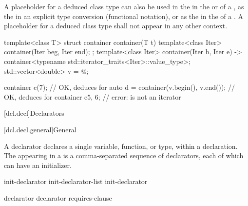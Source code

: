 \pnum
A placeholder for a deduced class type
can also be used
in the 
in the  or 
of a ,
as the 
in an explicit type conversion (functional notation),
or
as the  in the 
of a .
A placeholder for a deduced class type
shall not appear in any other context.

\pnum
\begin{example}
\begin{codeblock}
template<class T> struct container {
    container(T t) {}
    template<class Iter> container(Iter beg, Iter end);
};
template<class Iter>
container(Iter b, Iter e) -> container<typename std::iterator_traits<Iter>::value_type>;
std::vector<double> v = { @\commentellip@ };

container c(7);                         // OK, deduces  for 
auto d = container(v.begin(), v.end()); // OK, deduces  for 
container e{5, 6};                      // error:  is not an iterator
\end{codeblock}
\end{example}
%

[dcl.decl]{Declarators}%

[dcl.decl.general]{General}%

%
%
%
%
%

\pnum
A declarator declares a single variable, function, or type, within a declaration.
The
appearing in a 
is a comma-separated sequence of declarators,
each of which can have an initializer.

\begin{bnf}
\br
    init-declarator\br
    init-declarator-list \terminal{,} init-declarator
\end{bnf}

\begin{bnf}
\br
    declarator \br
    declarator requires-clause
\end{bnf}

